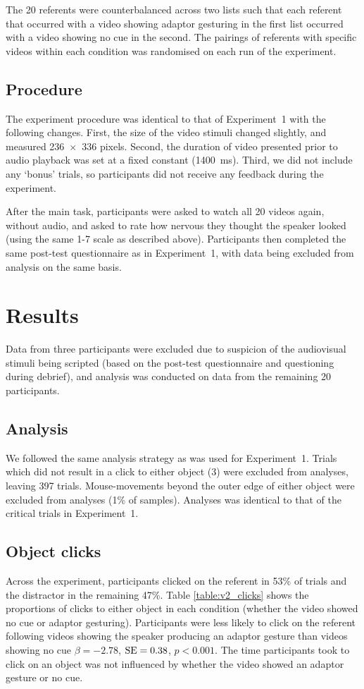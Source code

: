 \documentclass[a4paper,man,natbib]{apa6}
\newcommand{\resultsLog}[3]{$\beta = #1$, $\textnormal{SE} = #2$, $p #3$}
\begin{document}
The 20 referents were counterbalanced across two lists such that each referent that occurred with a video showing adaptor gesturing in the first list occurred with a video showing no cue in the second.
The pairings of referents with specific videos within each condition was randomised on each run of the experiment.

\subsection{Procedure}
The experiment procedure was identical to that of Experiment~1 with the following changes.
First, the size of the video stimuli changed slightly, and measured 236~$\times$~336 pixels.
Second, the duration of video presented prior to audio playback was set at a fixed constant (1400~ms).
Third, we did not include any `bonus' trials, so participants did not receive any feedback during the experiment.

After the main task, participants were asked to watch all 20 videos again, without audio, and asked to rate how nervous they thought the speaker looked (using the same 1-7 scale as described above).
Participants then completed the same post-test questionnaire as in Experiment~1, with data being excluded from analysis on the same basis.

\section{Results}
Data from three participants were excluded due to suspicion of the audiovisual stimuli being scripted (based on the post-test questionnaire and questioning during debrief), and analysis was conducted on data from the remaining 20 participants.

\subsection{Analysis}
We followed the same analysis strategy as was used for Experiment~1.
Trials which did not result in a click to either object (3) were excluded from analyses, leaving 397 trials.
Mouse-movements beyond the outer edge of either object were excluded from analyses (1\% of samples).
Analyses was identical to that of the critical trials in Experiment~1.

\subsection{Object clicks}
Across the experiment, participants clicked on the referent in 53\% of trials and the distractor in the remaining 47\%.
Table \ref{table:v2_clicks} shows the proportions of clicks to either object in each condition (whether the video showed no cue or adaptor gesturing).
Participants were less likely to click on the referent following videos showing the speaker producing an adaptor gesture than videos showing no cue \resultsLog{-2.78}{0.38}{<0.001}.
The time participants took to click on an object was not influenced by whether the video showed an adaptor gesture or no cue.
\end{document}
